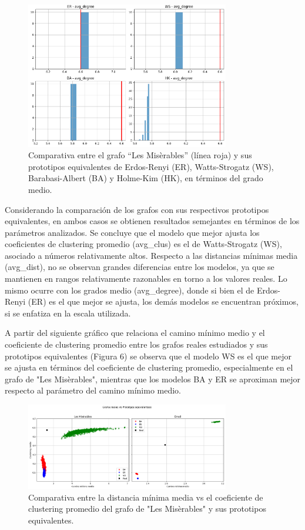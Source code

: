 \documentclass[conference]{IEEEtran}
\begin{document}
\begin{figure}[h]
    \centering
    \includegraphics[width=3.5in]{img/comp-prototipos_nm_lesmis-avg_degree.png}
    \captionsetup{width=0.85\linewidth, font=small}
    \caption{Comparativa entre el grafo “Les Misèrables” (línea roja) y sus prototipos equivalentes de Erdos-Renyi (ER), Watts-Strogatz (WS), Barabasi-Albert (BA) y Holme-Kim (HK), en términos del grado medio.}
    \label{fig:lesmis-avg_degree}
\end{figure}


\FloatBarrier


Considerando la comparación de los grafos con sus respectivos prototipos equivalentes, en ambos casos se obtienen resultados semejantes en términos de los parámetros analizados. Se concluye que el modelo que mejor ajusta los coeficientes de clustering promedio (avg\_clus) es el de Watts-Strogatz (WS), asociado a números relativamente altos. Respecto a las distancias mínimas media (avg\_dist), no se observan grandes diferencias entre los modelos, ya que se mantienen en rangos relativamente razonables en torno a los valores reales. Lo mismo ocurre con los grados medio (avg\_degree), donde si bien el de Erdos-Renyi (ER) es el que mejor se ajusta, los demás modelos se encuentran próximos, si se enfatiza en la escala utilizada.

A partir del siguiente gráfico que relaciona el camino mínimo medio y el coeficiente de clustering promedio entre los grafos reales estudiados y sus prototipos equivalentes (Figura 6) se observa que el modelo WS es el que mejor se ajusta en términos del coeficiente de clustering promedio, especialmente en el grafo de "Les Misèrables", mientras que los modelos BA y ER se aproximan mejor respecto al parámetro del camino mínimo medio.

\begin{figure}[h]
    \centering
    \includegraphics[width=3.5in]{img/comp-camino medio vs clust.png}
    \caption{Comparativa entre la distancia mínima media vs el coeficiente de clustering promedio del grafo de "Les Misèrables" y sus prototipos equivalentes.}
    \label{fig:emails-avg_distance}
\end{figure}
\end{document}
